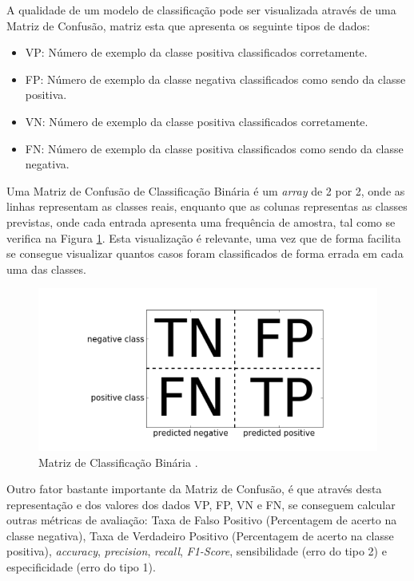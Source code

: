 \documentclass[12pt,a4paper,twoside]{report}
\begin{document}
{A qualidade de um modelo de classificação pode ser visualizada através de uma Matriz de Confusão, matriz esta que apresenta os seguinte tipos de dados:   

\begin{itemize} 
\itemsep-0.5em 
    \item \gls{VP}: Número de exemplo da classe positiva classificados corretamente.
    \item \gls{FP}: Número de exemplo da classe negativa classificados como sendo da classe positiva. 
    \item \gls{VN}: Número de exemplo da classe positiva classificados corretamente.
    \item \gls{FN}: Número de exemplo da classe positiva classificados como sendo da classe negativa.
\end{itemize}

Uma Matriz de Confusão de Classificação Binária é um \textit{array} de 2 por 2, onde as linhas representam as classes reais, enquanto que as colunas representas as classes previstas, onde cada entrada apresenta uma frequência de amostra, tal como se verifica na Figura \ref{fig:matrizbina}. Esta visualização é relevante, uma vez que de forma facilita se consegue visualizar quantos casos foram classificados de forma errada em cada uma das classes.

\begin{figure}[H]
    \centering
    \includegraphics[width=1\textwidth]{imagens/matrizbina.png}
    \caption{Matriz de Classificação Binária \cite{müller2016introduction}.}
    \label{fig:matrizbina}
\end{figure}

Outro fator bastante importante da Matriz de Confusão, é que através desta representação e dos valores dos dados VP, FP, VN e FN, se conseguem calcular outras métricas de avaliação:  Taxa de Falso Positivo (Percentagem de acerto na classe negativa), Taxa de Verdadeiro Positivo (Percentagem de acerto na classe positiva), \textit{accuracy}, \textit{precision}, \textit{recall}, \textit{F1-Score}, sensibilidade (erro do tipo 2) e especificidade (erro do tipo 1).

}
\end{document}
